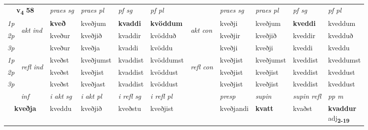 \noindent
\begin{tabular}{lllllllllll} \toprule
\multicolumn{2}{c}{\textbf{v{\textsubscript{4}}} \Large{\textbf{58}}}  &  \textit{praes sg}  & \textit{praes pl}  &\textit{ pf sg} & \textit{pf pl} &  &  \textit{praes sg}  & \textit{praes pl}  & \textit{pf sg} & \textit{pf pl } \\*
	\cmidrule{3-6} \cmidrule{8-11}
 {\textit{1p}} & \multirow{3}{*}{\begin{turn}{90}\textit{akt ind}\end{turn}} & \textbf{kveð} & kveðjum & \textbf{kvaddi} & \textbf{kvöddum} & \multirow{3}{*}{\begin{turn}{90}\textit{akt con}\end{turn}} &kveðji & kveðjum & \textbf{kveddi} & kveddum\\*
 {\textit{2p}} &  &  kveður  & kveðjið & kvaddir & kvödduð & & kveðjir & kveðjið & kveddir & kvedduð \\*
{\textit{3p}} &  & kveður & kveðja & kvaddi & kvöddu & & kveðji & kveðji& kveddi & kveddu \\*
\cmidrule{3-6} \cmidrule{8-11}
 {\textit{1p}} & \multirow{3}{*}{\begin{turn}{90}\textit{refl ind}\end{turn}}  & kveðst & kveðjumst & kvaddist & kvöddumst & \multirow{3}{*}{\begin{turn}{90}\textit{refl con}\end{turn}}  &kveðjist & kveðjumst & kveddist & kveddumst \\*
 {\textit{2p}} &  & kveðst & kveðjist & kvaddist & kvöddust & &kveðjist & kveðjist & kveddist & kveddust \\*
 {\textit{3p}}  & & kveðst & kveðjast & kvaddist & kvöddust & & kveðjist & kveðjist& kveddist & kveddust \\*
\cmidrule{3-6} \cmidrule{8-11}

   \multicolumn{2}{c}{\textit{inf}}  & \textit{i akt sg} & \textit{i akt pl} & \textit{i refl sg} & \textit{i refl pl} && \textit{presp} & \textit{supin} & \textit{supin refl} & \textit{pp m} \\*
  \multicolumn{2}{c}{\textbf{kveðja}} & kveddu  & kveðjið & kveðstu & kveðjist && kveðjandi &  \textbf{kvatt} & kvaðst & \specialcell{\textbf{kvaddur} \\ adj\textbf{\textsubscript{2-19}}} \\*
\end{tabular}


